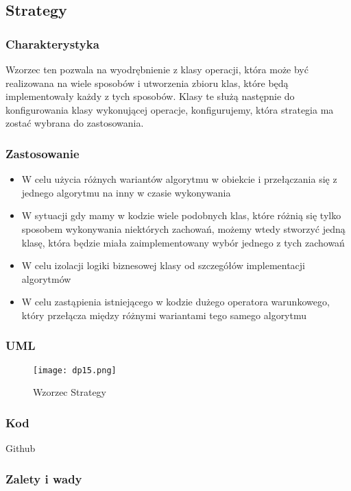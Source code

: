 \documentclass[a4paper,15pt]{article}
\begin{document}
\newpage
\subsection{Strategy}

\subsubsection{Charakterystyka}
Wzorzec ten pozwala na wyodrębnienie z klasy operacji, która może być realizowana na wiele sposobów i utworzenia zbioru klas, które będą implementowały każdy z tych sposobów. Klasy te służą następnie do konfigurowania klasy wykonującej operacje, konfigurujemy, która strategia ma zostać wybrana do zastosowania. 

\subsubsection{Zastosowanie}
\begin{itemize}
\item W celu użycia różnych wariantów algorytmu w obiekcie i przełączania się z jednego algorytmu na inny w czasie wykonywania
\item W sytuacji gdy mamy w kodzie wiele podobnych klas, które różnią się tylko sposobem wykonywania niektórych zachowań, możemy wtedy stworzyć jedną klasę, która będzie miała zaimplementowany wybór jednego z tych zachowań
\item W celu izolacji logiki biznesowej klasy od szczegółów implementacji algorytmów
\item W celu zastąpienia istniejącego w kodzie dużego operatora warunkowego, który przełącza między różnymi wariantami tego samego algorytmu
\end{itemize}


\subsubsection{UML}

\begin{figure}[H]
\centering
  \texttt{[image: dp15.png]}
  \caption{Wzorzec Strategy}
\end{figure}

\subsubsection{Kod}
Github

\subsubsection{Zalety i wady}
\end{document}
